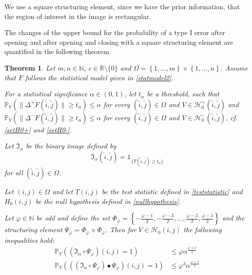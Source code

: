 \documentclass[a4paper,12pt]{article}
\newcommand{\norm}[1]{\lVert#1\rVert}
\theoremstyle{plain}
\newtheorem{theorem}{Theorem}[section]
\theoremstyle{definition}
\begin{document}
We use a square structuring element, since we have the prior information, that the region of interest in the image is rectangular.

The changes of the upper bound for the probability of a type I error after opening and after opening and closing with a square structuring element are quantified in the following theorem.

\begin{theorem}\label{thm: typeIinequalities}
	Let $m, n \in \mathbb{N}$, $c \in \mathbb{R} \setminus \{ 0 \}$ and $\Omega = \left\{ 1, \dots, m \right\} \times \left\{ 1, \dots, n \right\}$. Assume that $F$ follows the statistical model given in \eqref{statmodel2}.
	
	For a statistical significance $\alpha \in (0, 1)$, let $t_\alpha$ be a threshold, such that $\mathbb{P}_V( \norm{\Delta^+ F(\tilde{i}, \tilde{j})} \geq t_\alpha ) \leq \alpha$ for every $(\tilde{i}, \tilde{j}) \in \Omega$ and $V \in \mathcal{H}_0^+(\tilde{i}, \tilde{j})$ and $\mathbb{P}_V( \norm{\Delta^- F(\tilde{i}, \tilde{j})} \geq t_\alpha ) \leq \alpha$ for every $(\tilde{i}, \tilde{j}) \in \Omega$ and $V \in \mathcal{H}_0^-(\tilde{i}, \tilde{j})$, cf. \eqref{setH0+} and \eqref{setH0-}.
	
	Let $\mathfrak{I}_\alpha$ be the binary image defined by
	\begin{equation}
		\mathfrak{I}_\alpha(\tilde{i}, \tilde{j}) = \mathds{1}_{ \{ T(\tilde{i}, \tilde{j}) \geq t_\alpha \} }
	\end{equation}
	for all $(\tilde{i}, \tilde{j}) \in \Omega$.
	
	Let $(i, j) \in \Omega$ and let $T(i, j)$ be the test statistic defined in \eqref{teststatistic} and $H_0(i, j)$ be the null hypothesis defined in \eqref{nullhypothesis}.
	
	Let $\varphi \in \mathbb{N}$ be odd and define the set $\Phi_\varphi = \left\{ -\frac{\varphi - 1}{2}, -\frac{\varphi - 3}{2}, \dots, \frac{\varphi - 3}{2}, \frac{\varphi - 1}{2} \right\}$ and the structuring element $\Psi_\varphi = \Phi_\varphi \times \Phi_\varphi$.
	Then for $V \in \mathcal{H}_0(i, j)$ the following inequalities hold:
	\begin{align}
		\mathbb{P}_V\left( (\mathfrak{I}_\alpha \circ \Psi_\varphi)(i, j) = 1 \right) &\leq \varphi \alpha^{\frac{\varphi + 1}{2}} \label{ineq: typeIopening} \\
		\mathbb{P}_V\left( ((\mathfrak{I}_\alpha \circ \Psi_\varphi) \bullet \Psi_\varphi)(i, j) = 1 \right) &\leq \varphi^3 \alpha^{\frac{\varphi + 1}{2}} \label{ineq: typeIclosing}
	\end{align}
\end{theorem}
\end{document}
